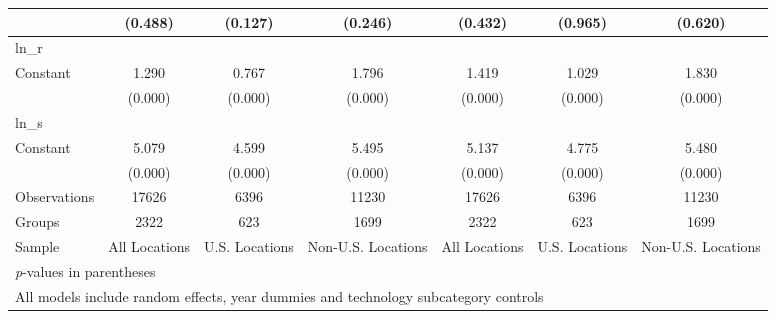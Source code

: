 \begin{table}[htbp]
\begin{tabular}{l*{6}{c}}
                &  (0.488)&  (0.127)&  (0.246)&  (0.432)&  (0.965)&  (0.620)\\
\hline
ln\_r            &         &         &         &         &         &         \\
Constant        &    1.290&    0.767&    1.796&    1.419&    1.029&    1.830\\
                &  (0.000)&  (0.000)&  (0.000)&  (0.000)&  (0.000)&  (0.000)\\
\hline
ln\_s            &         &         &         &         &         &         \\
Constant        &    5.079&    4.599&    5.495&    5.137&    4.775&    5.480\\
                &  (0.000)&  (0.000)&  (0.000)&  (0.000)&  (0.000)&  (0.000)\\
\hline
Observations    &    17626&     6396&    11230&    17626&     6396&    11230\\
Groups          &     2322&      623&     1699&     2322&      623&     1699\\
Sample          &All Locations&U.S. Locations&Non-U.S. Locations&All Locations&U.S. Locations&Non-U.S. Locations\\
\hline\hline
\multicolumn{7}{l}{\footnotesize \textit{p}-values in parentheses}\\
\multicolumn{7}{l}{\footnotesize All models include random effects, year dummies and technology subcategory controls}\\
\end{tabular}
\end{table}
